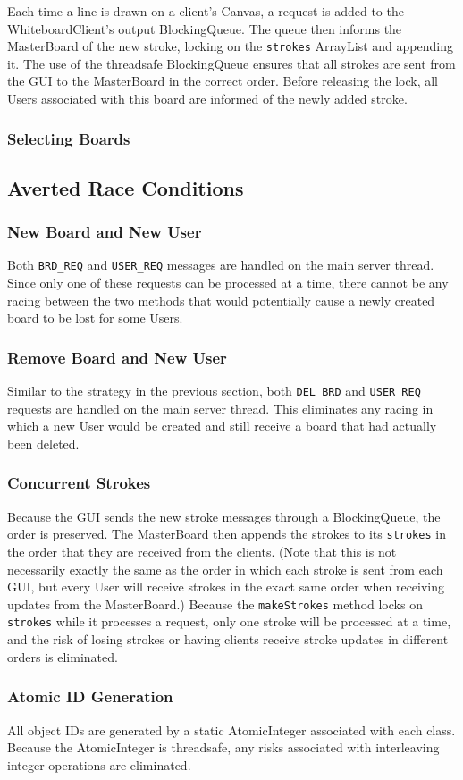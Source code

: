 Each time a line is drawn on a client's Canvas, a request is added to the WhiteboardClient's output BlockingQueue. The queue then informs the MasterBoard of the new stroke, locking on the \texttt{strokes} ArrayList and appending it. The use of the threadsafe BlockingQueue ensures that all strokes are sent from the GUI to the MasterBoard in the correct order. Before releasing the lock, all Users associated with this board are informed of the newly added stroke.

\subsubsection{Selecting Boards}

\subsection{Averted Race Conditions}

\subsubsection{New Board and New User}

Both \texttt{BRD\_REQ} and \texttt{USER\_REQ} messages are handled on the main server thread. Since only one of these requests can be processed at a time, there cannot be any racing between the two methods that would potentially cause a newly created board to be lost for some Users. 

\subsubsection{Remove Board and New User}

Similar to the strategy in the previous section, both \texttt{DEL\_BRD} and \texttt{USER\_REQ} requests are handled on the main server thread. This eliminates any racing in which a new User would be created and still receive a board that had actually been deleted.

\subsubsection{Concurrent Strokes}

Because the GUI sends the new stroke messages through a BlockingQueue, the order is preserved. The MasterBoard then appends the strokes to its \texttt{strokes} in the order that they are received from the clients. (Note that this is not necessarily exactly the same as the order in which each stroke is sent from each GUI, but every User will receive strokes in the exact same order when receiving updates from the MasterBoard.) Because the \texttt{makeStrokes} method locks on \texttt{strokes} while it processes a request, only one stroke will be processed at a time, and the risk of losing strokes or having clients receive stroke updates in different orders is eliminated.

\subsubsection{Atomic ID Generation}

All object IDs are generated by a static AtomicInteger associated with each class. Because the AtomicInteger is threadsafe, any risks associated with interleaving integer operations are eliminated.
